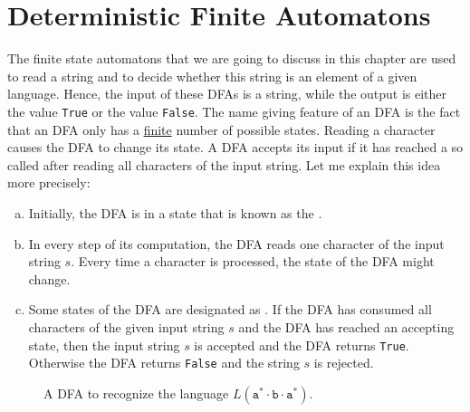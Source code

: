 \section{Deterministic Finite Automatons}
The finite state automatons that we are going to discuss in this chapter are used to read a string and
to decide whether this string is an element of a given language.  Hence, the input of these 
\textsc{DFA}s is a string, while the output is either the value \texttt{True} or the value \texttt{False}.
The name giving feature of an \textsc{DFA} is the fact that an \textsc{DFA} only has a
\underline{finite} number of possible states.  Reading a character causes the \textsc{DFA} to change its state.
A \textsc{DFA} accepts its input if it has reached a so called  after reading
all characters of the input string.  Let me explain this idea more precisely:
\begin{enumerate}[(a)]
\item Initially, the \textsc{DFA} is in a state that is known as the . 
\item In every step of its computation, the \textsc{DFA} reads one character of the input string
      $s$.  Every time a character is processed, the state of the \textsc{DFA} might change.
\item Some states of the \textsc{DFA} are designated as .  
      If the \textsc{DFA} has consumed all characters of the given input string $s$ and the \textsc{DFA}
      has reached an accepting state, then the input string $s$ is accepted and the \textsc{DFA}
      returns \texttt{True}.  Otherwise the \textsc{DFA} returns \texttt{False} and the string $s$
      is rejected.
\end{enumerate}
\begin{figure}[!ht]
  \centering
   \caption{A \textsc{DFA} to recognize the language $L(\texttt{a}^*\cdot\texttt{b}\cdot\texttt{a}^*)$.}
  \label{fig:abstara.dot}
\end{figure}


